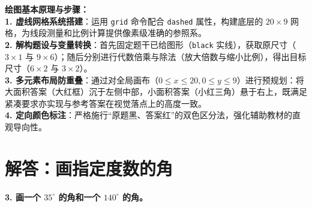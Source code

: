 \documentclass[12pt, a4paper]{ctexrep}
\begin{document}
\vspace{0.6cm}

{\small\color{blue!70!black}
\textbf{绘图基本原理与步骤：}\\
\textbf{1. 虚线网格系统搭建}：运用 \texttt{grid} 命令配合 \texttt{dashed} 属性，构建底层的 $20 \times 9$ 网格，为线段测量和比例计算提供像素级准确的参照系。\\
\textbf{2. 解构题设与变量转换}：首先固定题干已给图形（\texttt{black} 实线），获取原尺寸（$3\times 1$ 与 $9\times 6$）；随后分别进行代数倍乘与除法（放大倍数与缩小比例），得出目标尺寸（$6\times 2$ 与 $3\times 2$）。\\
\textbf{3. 多元素布局防重叠}：通过对全局画布（$0 \le x \le 20, 0 \le y \le 9$）进行预规划：将大面积答案（大红框）沉于左侧中部，小面积答案（小红三角）悬于右上，既满足紧凑要求亦实现与参考答案在视觉落点上的高度一致。\\
\textbf{4. 定向颜色标注}：严格施行“原题黑、答案红”的双色区分法，强化辅助教材的直观导向性。
}

\newpage

\section{解答：画指定度数的角}

\vspace{0.4cm}

\noindent\textbf{3. 画一个 $35^\circ$ 的角和一个 $140^\circ$ 的角。}

\vspace{1.2cm}

\begin{center}
\end{center}
\end{document}
